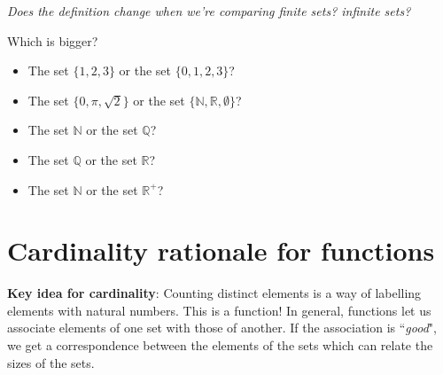 \documentclass[12pt, oneside]{article}
\begin{document}
{\it Does the definition change when we're comparing finite sets? infinite sets?}

Which is bigger? 
\begin{itemize}
    \item The set $\{1,2,3\}$ or the set $\{0,1,2,3\}$?
    \item The set $\{0, \pi, \sqrt{2} \}$ or the set $\{\mathbb{N}, \mathbb{R}, \emptyset\}$?
    \item The set $\mathbb{N}$ or the set $\mathbb{Q}$?
    \item The set $\mathbb{Q}$ or the set $\mathbb{R}$?
    \item The set $\mathbb{N}$ or the set $\mathbb{R}^+$?
\end{itemize}

 \vfill
\section*{Cardinality rationale for functions}


{\bf Key idea for cardinality}: Counting 
distinct elements is a way of labelling elements
with natural numbers. This is a function!
In general, functions let us 
associate elements of one set with those
of another. If the association is ``{\it good}", 
we get a correspondence between the elements of the sets
which can relate the sizes of the sets. \vfill
\end{document}
